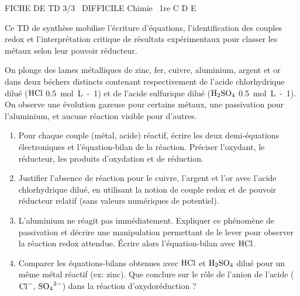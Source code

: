 \documentclass[11pt]{article}
\begin{document}
\begin{tcolorbox}[enhanced,colback=popink,colframe=popink,arc=10pt,boxrule=0pt,left=12pt,right=12pt,top=9pt,bottom=9pt]
{\color{white}\popxbold\small FICHE DE TD 3/3 \textbullet\ DIFFICILE \hfill Chimie \textbullet\ 1re C D E\par}
\end{tcolorbox}
\vspace{4pt}
Ce TD de synthèse mobilise l'écriture d'équations, l'identification des couples redox et l'interprétation critique de résultats expérimentaux pour classer les métaux selon leur pouvoir réducteur.

\begin{exercice}
On plonge des lames métalliques de zinc, fer, cuivre, aluminium, argent et or dans deux béchers distincts contenant respectivement de l'acide chlorhydrique dilué ($\ce{HCl}$ \SI{0,5}{mol.L-1}) et de l'acide sulfurique dilué ($\ce{H2SO4}$ \SI{0,5}{mol.L-1}). On observe une évolution gazeuse pour certains métaux, une passivation pour l'aluminium, et aucune réaction visible pour d'autres.
\begin{enumerate}
    \item Pour chaque couple (métal, acide) réactif, écrire les deux demi-équations électroniques et l'équation-bilan de la réaction. Préciser l'oxydant, le réducteur, les produits d'oxydation et de réduction.
    \item Justifier l'absence de réaction pour le cuivre, l'argent et l'or avec l'acide chlorhydrique dilué, en utilisant la notion de couple redox et de pouvoir réducteur relatif (sans valeurs numériques de potentiel).
    \item L'aluminium ne réagit pas immédiatement. Expliquer ce phénomène de passivation et décrire une manipulation permettant de le lever pour observer la réaction redox attendue. Écrire alors l'équation-bilan avec $\ce{HCl}$.
    \item Comparer les équations-bilans obtenues avec $\ce{HCl}$ et $\ce{H2SO4}$ dilué pour un même métal réactif (ex: zinc). Que conclure sur le rôle de l'anion de l'acide ($\ce{Cl-}$, $\ce{SO4^{2-}}$) dans la réaction d'oxydoréduction ?
\end{enumerate}
\end{exercice}
\end{document}
